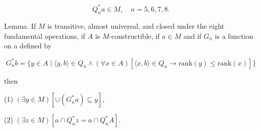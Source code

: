$$Q_n^*a \in M, \quad n = 5, 6, 7, 8.$$

Lemma. If $M$ is transitive, almost universal, and closed under the eight fundamental operations, if $A$ is $M$-constructible, if $a \in M$ and if $G_n$ is a function on a defined by

$$G_n^*b = \{y \in A \mid \langle y, b \rangle \in Q_n \wedge (\forall x \in A)[\langle x, b \rangle \in Q_n \rightarrow \text{rank}(y) \leq \text{rank}(x)]\}$$

then

(1) $(\exists y \in M)[\cup(G_n^*a) \subseteq y]$,

(2) $(\exists z \in M)[a \cap Q_n^*z = a \cap Q_n^*A]$.
